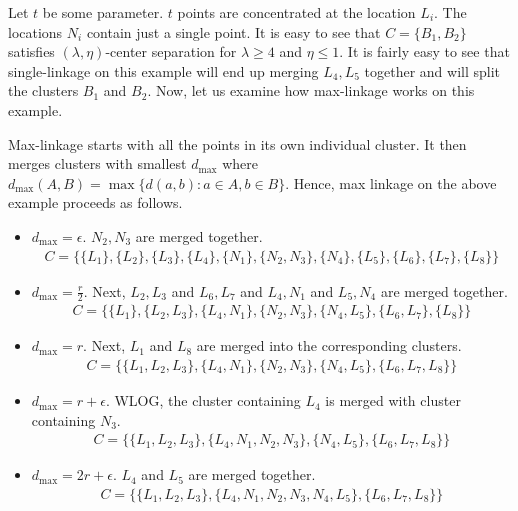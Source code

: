 \documentclass[12pt]{article}
\begin{document}
Let $t$ be some parameter. $t$ points are concentrated at the location $L_i$. The locations $N_i$ contain just a single point. It is easy to see that $C = \{B_1, B_2 \}$ satisfies $(\lambda, \eta)$-center separation for $\lambda \ge 4$ and $\eta \le 1$. It is fairly easy to see that single-linkage on this example will end up merging $L_4, L_5$ together and will split the clusters $B_1$ and $B_2$. Now, let us examine how max-linkage works on this example.

Max-linkage starts with all the points in its own individual cluster. It then merges clusters with smallest $d_{\max}$ where $d_{\max}(A, B) = \max\{d(a, b): a \in A, b \in B\}$. Hence, max linkage on the above example proceeds as follows. 
\begin{itemize}[nolistsep] 
\item $d_{\max} = \epsilon$. $N_2, N_3$ are merged together. 
\vspace{-0.1in}\begin{align*}
C = \{\{L_1\},\{L_2\},\{L_3\},\{L_4\},\{N_1\},\{N_2,N_3\},\{N_4\},\{L_5\},\{L_6\},\{L_7\},\{L_8\}\}
\end{align*}
\item \vspace{-0.1in} $d_{\max} = \frac{r}{2}$. Next, $L_2, L_3$ and $L_6, L_7$ and $L_4, N_1$ and $L_5, N_4$ are merged together. 
\vspace{-0.1in}\begin{align*}
C = \{\{L_1\},\{L_2,L_3\},\{L_4, N_1\},\{N_2,N_3\},\{N_4, L_5\},\{L_6, L_7\},\{L_8\}\}
\end{align*}
\item \vspace{-0.1in} $d_{\max} = r$. Next, $L_1$ and $L_8$ are merged into the corresponding clusters. 
\vspace{-0.3in}\begin{align*}
C = \{\{L_1, L_2,L_3\},\{L_4, N_1\},\{N_2,N_3\},\{N_4, L_5\},\{L_6, L_7, L_8\}\}
\end{align*}
\item \vspace{-0.1in} $d_{\max} = r+\epsilon$. WLOG, the cluster containing $L_4$ is merged with cluster containing $N_3$. 
\vspace{-0.1in}\begin{align*}
C = \{\{L_1, L_2,L_3\},\{L_4, N_1, N_2,N_3\},\{N_4, L_5\},\{L_6, L_7, L_8\}\}
\end{align*}
\item \vspace{-0.1in} $d_{\max} = 2r+\epsilon$. $L_4$ and $L_5$ are merged together. 
\vspace{-0.1in}\begin{align*}
C = \{\{L_1, L_2,L_3\},\{L_4, N_1, N_2,N_3, N_4, L_5\},\{L_6, L_7, L_8\}\}
\end{align*}
\end{itemize}
\end{document}

